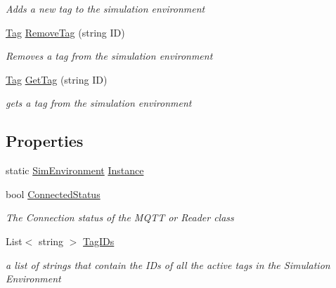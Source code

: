 \begin{DoxyCompactItemize}
\begin{DoxyCompactList}\small\item\em Adds a new tag to the simulation environment \end{DoxyCompactList}\item 
\hyperlink{class_pozyx_subscriber_1_1_framework_1_1_tag}{Tag} \hyperlink{class_pozyx_subscriber_1_1_sim_environment_a6386074fe09ea029c9203bd5cb969650}{Remove\+Tag} (string ID)
\begin{DoxyCompactList}\small\item\em Removes a tag from the simulation environment \end{DoxyCompactList}\item 
\hyperlink{class_pozyx_subscriber_1_1_framework_1_1_tag}{Tag} \hyperlink{class_pozyx_subscriber_1_1_sim_environment_aafaa3f130c9a8cc0a0eacb29253fbd7d}{Get\+Tag} (string ID)
\begin{DoxyCompactList}\small\item\em gets a tag from the simulation environment \end{DoxyCompactList}\end{DoxyCompactItemize}
\subsection*{Properties}
\begin{DoxyCompactItemize}
\item 
static \hyperlink{class_pozyx_subscriber_1_1_sim_environment}{Sim\+Environment} \hyperlink{class_pozyx_subscriber_1_1_sim_environment_a57d7b43dd1ff01a963153b24a79649a4}{Instance}
\item 
bool \hyperlink{class_pozyx_subscriber_1_1_sim_environment_a32da22171f3ba4173336035846e3c170}{Connected\+Status}
\begin{DoxyCompactList}\small\item\em The Connection status of the M\+Q\+TT or Reader class \end{DoxyCompactList}\item 
List$<$ string $>$ \hyperlink{class_pozyx_subscriber_1_1_sim_environment_a7395c9fc1afe5a0686f2b6693eef748b}{Tag\+I\+Ds}
\begin{DoxyCompactList}\small\item\em a list of strings that contain the I\+Ds of all the active tags in the Simulation Environment \end{DoxyCompactList}\end{DoxyCompactItemize}

